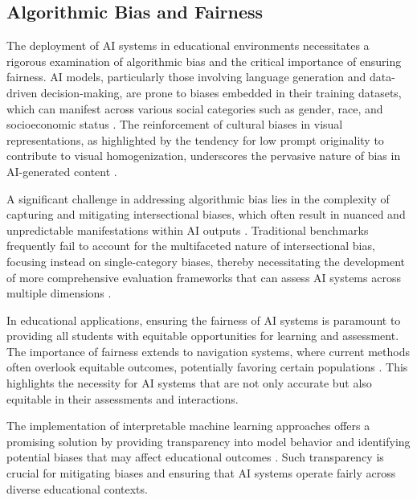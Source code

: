 
\subsection{Algorithmic Bias and Fairness} \label{subsec:Algorithmic Bias and Fairness}



The deployment of AI systems in educational environments necessitates a rigorous examination of algorithmic bias and the critical importance of ensuring fairness. AI models, particularly those involving language generation and data-driven decision-making, are prone to biases embedded in their training datasets, which can manifest across various social categories such as gender, race, and socioeconomic status \cite{kasneci2023chatgpt}. The reinforcement of cultural biases in visual representations, as highlighted by the tendency for low prompt originality to contribute to visual homogenization, underscores the pervasive nature of bias in AI-generated content \cite{palmini2024patternscreativityuserinput}.



A significant challenge in addressing algorithmic bias lies in the complexity of capturing and mitigating intersectional biases, which often result in nuanced and unpredictable manifestations within AI outputs \cite{nimase2024morecontextshelpsarcasm}. Traditional benchmarks frequently fail to account for the multifaceted nature of intersectional bias, focusing instead on single-category biases, thereby necessitating the development of more comprehensive evaluation frameworks that can assess AI systems across multiple dimensions \cite{m2023comparativeanalysisimbalancedmalware}.



In educational applications, ensuring the fairness of AI systems is paramount to providing all students with equitable opportunities for learning and assessment. The importance of fairness extends to navigation systems, where current methods often overlook equitable outcomes, potentially favoring certain populations \cite{brandao2020fairnavigationplanninghumanitarian}. This highlights the necessity for AI systems that are not only accurate but also equitable in their assessments and interactions.



The implementation of interpretable machine learning approaches offers a promising solution by providing transparency into model behavior and identifying potential biases that may affect educational outcomes \cite{narayanan2023democratizecareneedfairness}. Such transparency is crucial for mitigating biases and ensuring that AI systems operate fairly across diverse educational contexts.



